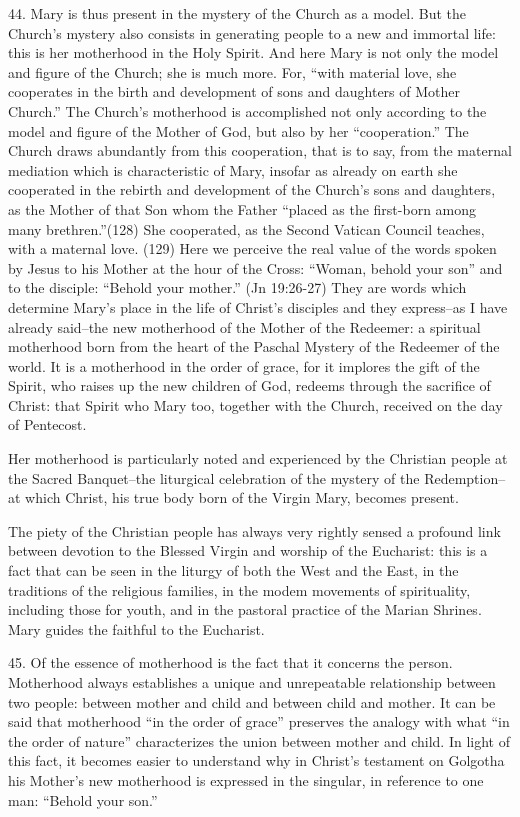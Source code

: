 \documentclass[oneside]{book}
\begin{document}
44. Mary is thus present in the mystery of the Church as a model. But the
Church's mystery also consists in generating people to a new and immortal life:
this is her motherhood in the Holy Spirit. And here Mary is not only the model
and figure of the Church; she is much more. For, ``with material love, she
cooperates in the birth and development of sons and daughters of Mother
Church.'' The Church's motherhood is accomplished not only according to the
model and figure of the Mother of God, but also by her ``cooperation.'' The
Church draws abundantly from this cooperation, that is to say, from the maternal
mediation which is characteristic of Mary, insofar as already on earth she
cooperated in the rebirth and development of the Church's sons and daughters, as
the Mother of that Son whom the Father ``placed as the first-born among many
brethren.''(128) She cooperated, as the Second Vatican Council teaches, with a
maternal love. 
(129) Here we perceive the real value of the words spoken by Jesus to his Mother
at the hour of the Cross: ``Woman, behold your son'' and to the disciple:
``Behold your mother.'' (Jn 19:26-27) They are words which determine Mary's
place in the life of Christ's disciples and they express--as I have already
said--the new motherhood of the Mother of the Redeemer: a spiritual motherhood
born from the heart of the Paschal Mystery of the Redeemer of the world. It is a
motherhood in the order of grace, for it implores the gift of the Spirit, who
raises up the new children of God, redeems through the sacrifice of Christ: that
Spirit who Mary too, together with the Church, received on the day of Pentecost.

Her motherhood is particularly noted and experienced by the Christian people at
the Sacred Banquet--the liturgical celebration of the mystery of the
Redemption--at which Christ, his true body born of the Virgin Mary, becomes
present.

The piety of the Christian people has always very rightly sensed a profound link
between devotion to the Blessed Virgin and worship of the Eucharist: this is a
fact that can be seen in the liturgy of both the West and the East, in the
traditions of the religious families, in the modem movements of spirituality,
including those for youth, and in the pastoral practice of the Marian
Shrines. Mary guides the faithful to the Eucharist.

45. Of the essence of motherhood is the fact that it concerns the
person. Motherhood always establishes a unique and unrepeatable relationship
between two people: between mother and child and between child and mother. It
can be said that motherhood ``in the order of grace'' preserves the analogy with
what ``in the order of nature'' characterizes the union between mother and
child. In light of this fact, it becomes easier to understand why in Christ's
testament on Golgotha his Mother's new motherhood is expressed in the singular,
in reference to one man: ``Behold your son.''
\end{document}
